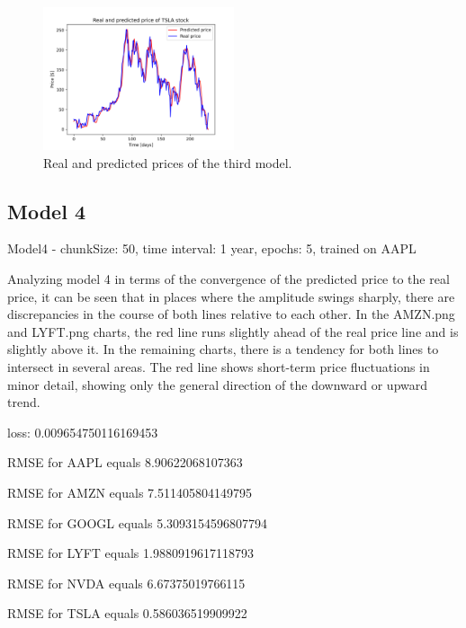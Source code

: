 \begin{figure}
\includegraphics[width=0.5\textwidth]{./graf/model3/TSLA.png}
\caption{Real and predicted prices of the third model.}
\label{fig:label}
\end{figure} 

\clearpage
\subsection{Model 4}

Model4 - chunkSize: 50, time interval: 1 year, epochs: 5, trained on AAPL\par\bigskip
Analyzing model 4 in terms of the convergence of the predicted price to the real price, it can be seen that in places where the amplitude swings sharply, there are discrepancies in the course of
both lines relative to each other. In the AMZN.png and LYFT.png charts, the red line runs slightly
ahead of the real price line and is slightly above it. In the remaining charts, there is a tendency for
both lines to intersect in several areas. The red line shows short-term price fluctuations in minor
detail, showing only the general direction of the downward or upward trend.
\par\bigskip
loss: 0.009654750116169453\par
RMSE for AAPL equals 8.90622068107363\par
RMSE for AMZN equals 7.511405804149795\par
RMSE for GOOGL equals 5.3093154596807794\par
RMSE for LYFT equals 1.9880919617118793\par
RMSE for NVDA equals 6.67375019766115\par
RMSE for TSLA equals 0.586036519909922\par


